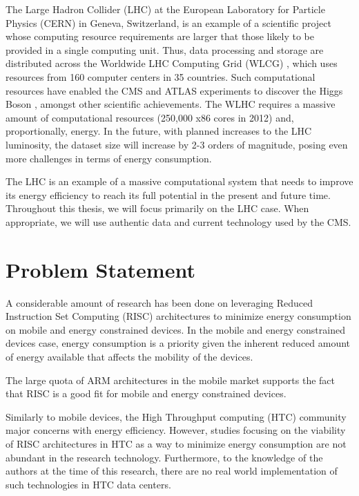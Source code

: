 The Large Hadron Collider (LHC) \cite{LHC} at the European Laboratory for Particle
Physics (CERN) in Geneva, Switzerland, is an example of a scientific project
whose computing resource requirements are larger that those likely to be provided 
in a single computing unit. Thus, data processing and storage are distributed across 
the Worldwide LHC
Computing Grid (WLCG) \cite{WLCG}, which uses resources from 160 computer centers in 35
countries. Such computational resources have enabled the CMS \cite{CMS} and ATLAS \cite{ATLAS}
experiments to discover the Higgs Boson \cite{HIGGS2} \cite{HIGGS1}, amongst other scientific 
achievements. 
The WLHC requires a massive amount of computational resources 
(250,000 x86 cores in 2012) and,
proportionally, energy. In the future, with planned increases to the LHC
luminosity, the dataset size will increase by 2-3 orders of magnitude,
posing even more challenges in terms of energy consumption.

The LHC is an example of a massive computational system that needs to improve its
energy efficiency to reach its full potential in the present and future time.
Throughout this thesis, we will focus primarily on the LHC case. When
appropriate, we will use authentic data and current technology used by the CMS.  


\section{Problem Statement}
A considerable amount of research has been done on leveraging Reduced
Instruction Set Computing (RISC) architectures to minimize energy consumption on 
mobile and energy constrained devices. In the mobile and energy constrained devices case, energy consumption is a
priority given the inherent reduced amount of energy available that affects the mobility of the devices. 

The large quota of ARM architectures in the mobile market supports the fact that
RISC is a good fit for mobile and energy constrained devices.


Similarly to mobile devices, the High Throughput computing (HTC) community major concerns with energy efficiency. However, studies focusing on the viability 
of RISC architectures in HTC as a way to minimize energy consumption are not
abundant in the research technology. Furthermore, to the knowledge of the
authors at the time of this research, there are no real world implementation of such technologies in 
HTC data centers.


